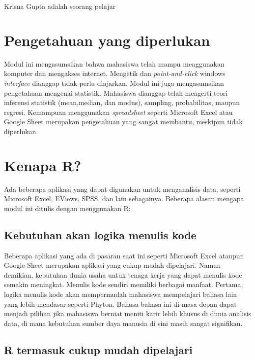 \documentclass[
]{book}
\begin{document}
Krisna Gupta adalah seorang pelajar

\hypertarget{pengetahuan-yang-diperlukan}{%
\section{Pengetahuan yang diperlukan}\label{pengetahuan-yang-diperlukan}}

Modul ini mengasumsikan bahwa mahasiswa telah mampu menggunakan komputer dan mengakses internet. Mengetik dan \emph{point-and-click} windows \emph{interface} dianggap tidak perlu diajarkan. Modul ini juga mengasumsikan pengetahuan mengenai statistik. Mahasiswa dianggap telah mengerti teori inferensi statistik (mean,median, dan modus), sampling, probabilitas, maupun regresi. Kemampuan menggunakan \emph{spreadsheet} seperti Microsoft Excel atau Google Sheet merupakan pengetahuan yang sangat membantu, meskipun tidak diperlukan.

\hypertarget{kenapa-r}{%
\section{Kenapa R?}\label{kenapa-r}}

Ada beberapa aplikasi yang dapat digunakan untuk menganalisis data, seperti Microsoft Excel, EViews, SPSS, dan lain sebagainya. Beberapa alasan mengapa modul ini ditulis dengan menggunakan R:

\hypertarget{kebutuhan-akan-logika-menulis-kode}{%
\subsection{Kebutuhan akan logika menulis kode}\label{kebutuhan-akan-logika-menulis-kode}}

Beberapa aplikasi yang ada di pasaran saat ini seperti Microsoft Excel ataupun Google Sheet merupakan aplikasi yang cukup mudah dipelajari. Namun demikian, kebutuhan dunia usaha untuk tenaga kerja yang dapat menulis kode semakin meningkat. Menulis kode sendiri memiliki berbagai manfaat. Pertama, logika menulis kode akan mempermudah mahasiswa mempelajari bahasa lain yang lebih mendasar seperti Phyton. Bahasa-bahasa ini di masa depan dapat menjadi pilihan jika mahasiswa berniat meniti karir lebih khusus di dunia analisis data, di mana kebutuhan sumber daya manusia di sini masih sangat signifikan.

\hypertarget{r-termasuk-cukup-mudah-dipelajari}{%
\subsection{R termasuk cukup mudah dipelajari}\label{r-termasuk-cukup-mudah-dipelajari}}
\end{document}
